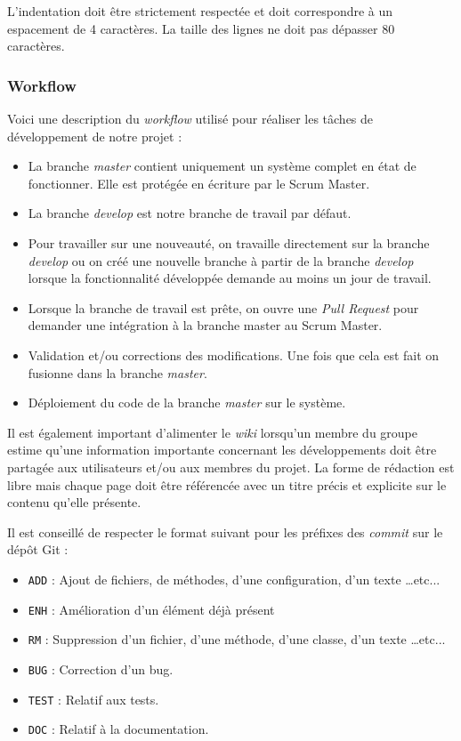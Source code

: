\documentclass[10pt,a4paper]{article}
\begin{document}
L'indentation doit être strictement respectée et doit correspondre à un espacement de 4 caractères. La taille des lignes ne doit pas dépasser 80 caractères.


\subsubsection{Workflow}

Voici une description du \textit{workflow} utilisé pour réaliser les tâches de développement de notre projet :
\begin{itemize}
\item La branche \textit{master} contient uniquement un système complet en état de fonctionner. Elle est protégée en écriture par le Scrum Master.
\item La branche \textit{develop} est notre branche de travail par défaut.
\item Pour travailler sur une nouveauté, on travaille directement sur la branche \textit{develop} ou on créé une nouvelle branche à partir de la branche \textit{develop} lorsque la fonctionnalité développée demande au moins un jour de travail.
\item Lorsque la branche de travail est prête, on ouvre une \textit{Pull Request} pour demander une intégration à la branche master au Scrum Master.
\item Validation et/ou corrections des modifications. Une fois que cela est fait on fusionne dans la branche \textit{master}.
\item Déploiement du code de la branche \textit{master} sur le système.
\end{itemize}

Il est également important d'alimenter le \textit{wiki} lorsqu'un membre du groupe estime qu'une information importante concernant les développements doit être partagée aux utilisateurs et/ou aux membres du projet. La forme de rédaction est libre mais chaque page doit être référencée avec un titre précis et explicite sur le contenu qu'elle présente.

Il est conseillé de respecter le format suivant pour les préfixes des \textit{commit} sur le dépôt Git :
\begin{itemize}

\item \verb|ADD| : Ajout de fichiers, de méthodes, d'une configuration, d'un texte \ldots etc...
\item \verb|ENH| : Amélioration d'un élément déjà présent
\item \verb|RM| : Suppression d'un fichier, d'une méthode, d'une classe, d'un texte \ldots etc...
\item \verb|BUG| : Correction d'un bug.
\item \verb|TEST| : Relatif aux tests.
\item \verb|DOC| : Relatif à la documentation.
\end{itemize}
\end{document}
